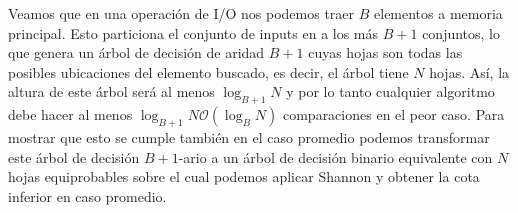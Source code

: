 \documentclass[dcc,uchile]{fcfmcourse}
\theoremstyle{plain}
\theoremstyle{definition}
\begin{document}
\begin{problems}
\begin{enumerate}[1.]
\end{enumerate}
\problem Veamos que en una operación de I/O nos podemos traer $B$ elementos a memoria principal. Esto particiona el conjunto de inputs en a los más $B+1$ conjuntos, lo que genera un árbol de decisión de aridad $B+1$ cuyas hojas son todas las posibles ubicaciones del elemento buscado, es decir, el árbol tiene $N$ hojas. Así, la altura de este árbol será al menos $\log_{B+1}{N}$ y por lo tanto cualquier algoritmo debe hacer al menos $\log_{B+1}{N} \mathcal{O}(\log_{B}{N})$ comparaciones en el peor caso. Para mostrar que esto se cumple también en el caso promedio podemos transformar este árbol de decisión $B+1$-ario a un árbol de decisión binario equivalente con $N$ hojas equiprobables sobre el cual podemos aplicar Shannon y obtener la cota inferior en caso promedio.
\end{problems}
\end{document}
